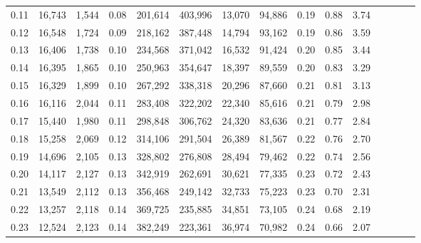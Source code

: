 \begin{tabular}{rrrcrrrrrrrrrrr}
0.11 &  16,743 &  1,544 &                                       0.08 &  201,614 &  403,996 &   13,070 &   94,886 &  0.19 &  0.88 &                         3.74 \\
0.12 &  16,548 &  1,724 &                                       0.09 &  218,162 &  387,448 &   14,794 &   93,162 &  0.19 &  0.86 &                         3.59 \\
0.13 &  16,406 &  1,738 &                                       0.10 &  234,568 &  371,042 &   16,532 &   91,424 &  0.20 &  0.85 &                         3.44 \\
0.14 &  16,395 &  1,865 &                                       0.10 &  250,963 &  354,647 &   18,397 &   89,559 &  0.20 &  0.83 &                         3.29 \\
0.15 &  16,329 &  1,899 &                                       0.10 &  267,292 &  338,318 &   20,296 &   87,660 &  0.21 &  0.81 &                         3.13 \\
0.16 &  16,116 &  2,044 &                                       0.11 &  283,408 &  322,202 &   22,340 &   85,616 &  0.21 &  0.79 &                         2.98 \\
0.17 &  15,440 &  1,980 &                                       0.11 &  298,848 &  306,762 &   24,320 &   83,636 &  0.21 &  0.77 &                         2.84 \\
0.18 &  15,258 &  2,069 &                                       0.12 &  314,106 &  291,504 &   26,389 &   81,567 &  0.22 &  0.76 &                         2.70 \\
0.19 &  14,696 &  2,105 &                                       0.13 &  328,802 &  276,808 &   28,494 &   79,462 &  0.22 &  0.74 &                         2.56 \\
0.20 &  14,117 &  2,127 &                                       0.13 &  342,919 &  262,691 &   30,621 &   77,335 &  0.23 &  0.72 &                         2.43 \\
0.21 &  13,549 &  2,112 &                                       0.13 &  356,468 &  249,142 &   32,733 &   75,223 &  0.23 &  0.70 &                         2.31 \\
0.22 &  13,257 &  2,118 &                                       0.14 &  369,725 &  235,885 &   34,851 &   73,105 &  0.24 &  0.68 &                         2.19 \\
0.23 &  12,524 &  2,123 &                                       0.14 &  382,249 &  223,361 &   36,974 &   70,982 &  0.24 &  0.66 &                         2.07 \\

\end{tabular}
